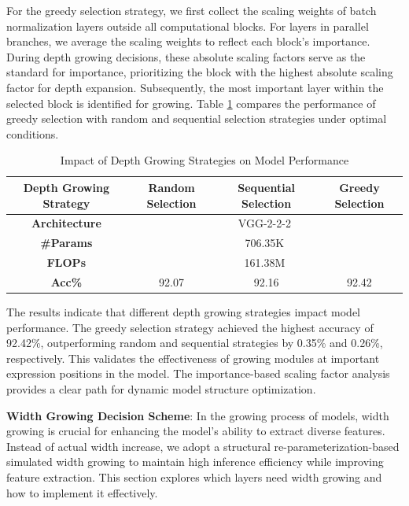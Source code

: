 \documentclass[preprint,12pt]{elsarticle}
\begin{document}
For the greedy selection strategy, we first collect the scaling weights of batch normalization layers outside all computational blocks. For layers in parallel branches, we average the scaling weights to reflect each block's importance. During depth growing decisions, these absolute scaling factors serve as the standard for importance, prioritizing the block with the highest absolute scaling factor for depth expansion. Subsequently, the most important layer within the selected block is identified for growing. Table \ref{table:depth_growth_strategies} compares the performance of greedy selection with random and sequential selection strategies under optimal conditions.

\begin{table}[ht]
\centering
\tiny
\renewcommand{\arraystretch}{1.3}
\begin{adjustbox}{center}
\begin{tabular}{c|ccc}
\hline
\textbf{Depth Growing Strategy} & \textbf{Random Selection} & \textbf{Sequential Selection} & \textbf{Greedy Selection} \\
\hline
\textbf{Architecture} & \multicolumn{3}{c}{VGG-2-2-2} \\
\hline
\textbf{\#Params} & \multicolumn{3}{c}{706.35K} \\
\hline
\textbf{FLOPs} & \multicolumn{3}{c}{161.38M} \\
\hline
\textbf{Acc\%} & 92.07 & 92.16 & 92.42 \\
\hline
\end{tabular}
\end{adjustbox}
\caption{Impact of Depth Growing Strategies on Model Performance}
\label{table:depth_growth_strategies}
\end{table}

The results indicate that different depth growing strategies impact model performance. The greedy selection strategy achieved the highest accuracy of 92.42\%, outperforming random and sequential strategies by 0.35\% and 0.26\%, respectively. This validates the effectiveness of growing modules at important expression positions in the model. The importance-based scaling factor analysis provides a clear path for dynamic model structure optimization.

\textbf{Width Growing Decision Scheme}: In the growing process of models, width growing is crucial for enhancing the model's ability to extract diverse features. Instead of actual width increase, we adopt a structural re-parameterization-based simulated width growing to maintain high inference efficiency while improving feature extraction. This section explores which layers need width growing and how to implement it effectively.
\end{document}
